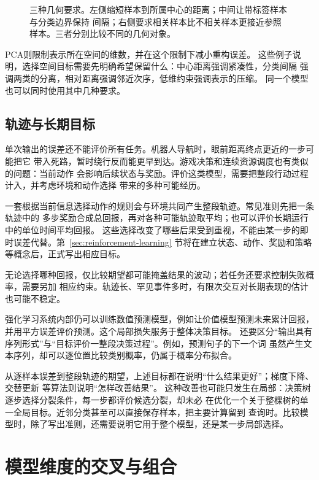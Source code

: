 \begin{figure}[t]
  \centering
  
  \caption{三种几何要求。左侧缩短样本到所属中心的距离；中间让带标签样本与分类边界保持
  间隔；右侧要求相关样本比不相关样本更接近参照样本。三者分别比较不同的几何对象。}
  \label{fig:models-spatial-objectives}
\end{figure}

PCA则限制表示所在空间的维数，并在这个限制下减小重构误差。
这些例子说明，选择空间目标需要先明确希望保留什么：中心距离强调紧凑性，分类间隔
强调两类的分离，相对距离强调邻近次序，低维约束强调表示的压缩。
同一个模型也可以同时使用其中几种要求。

\FloatBarrier
\subsection{轨迹与长期目标}
\label{sec:models-sequence-objectives}

单次输出的误差还不能评价所有任务。机器人导航时，眼前距离终点更近的一步可能把它
带入死路，暂时绕行反而能更早到达。游戏决策和连续资源调度也有类似的问题：当前动作
会影响后续状态与奖励。评价这类模型，需要把整段行动过程计入，并考虑环境和动作选择
带来的多种可能经历。

一套根据当前信息选择动作的规则会与环境共同产生整段轨迹。常见准则先把一条轨迹中的
多步奖励合成总回报，再对各种可能轨迹取平均；也可以评价长期运行中的单位时间平均回报。
这些选择改变了哪些后果受到重视，不能由某一步的即时误差代替。第~\ref{sec:reinforcement-learning}
节将在建立状态、动作、奖励和策略等概念后，正式写出相应目标。

无论选择哪种回报，仅比较期望都可能掩盖结果的波动；若任务还要求控制失败概率，需要另加
相应约束。轨迹长、罕见事件多时，有限次交互对长期表现的估计也可能不稳定。

强化学习系统内部仍可以训练数值预测模型，例如让价值模型预测未来累计回报，
并用平方误差评价预测。这个局部损失服务于整体决策目标。
还要区分“输出具有序列形式”与“目标评价一整段决策过程”。例如，预测句子的下一个词
虽然产生文本序列，却可以逐位置比较类别概率，仍属于概率分布拟合。

从逐样本误差到整段轨迹的期望，上述目标都在说明“什么结果更好”；梯度下降、交替更新
等算法则说明“怎样改善结果”。
这种改善也可能只发生在局部：决策树逐步选择分裂条件，每一步都评价候选分裂，却未必
在优化一个关于整棵树的单一全局目标。近邻分类甚至可以直接保存样本，把主要计算留到
查询时。比较模型时，除了写出准则，还需要说明它用于整个模型，还是某一步局部选择。

\FloatBarrier
\section{模型维度的交叉与组合}
\label{sec:models-crossing}

